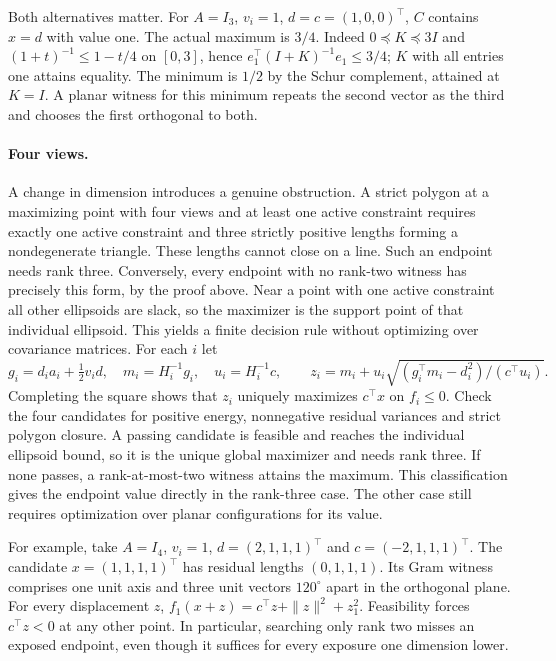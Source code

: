 Both alternatives matter. For $A=I_3$, $v_i=1$, $d=c=(1,0,0)^\top$, $C$ contains $x=d$ with value one. The actual maximum is $3/4$. Indeed $0\preceq K\preceq3I$ and $(1+t)^{-1}\le1-t/4$ on $[0,3]$, hence $e_1^\top(I+K)^{-1}e_1\le3/4$; $K$ with all entries one attains equality. The minimum is $1/2$ by the Schur complement, attained at $K=I$. A planar witness for this minimum repeats the second vector as the third and chooses the first orthogonal to both.

\paragraph{Four views.} A change in dimension introduces a genuine obstruction. A strict polygon at a maximizing point with four views and at least one active constraint requires exactly one active constraint and three strictly positive lengths forming a nondegenerate triangle. These lengths cannot close on a line. Such an endpoint needs rank three. Conversely, every endpoint with no rank-two witness has precisely this form, by the proof above. Near a point with one active constraint all other ellipsoids are slack, so the maximizer is the support point of that individual ellipsoid. This yields a finite decision rule without optimizing over covariance matrices. For each $i$ let
\[
 g_i=d_i a_i+\tfrac12v_id,\quad m_i=H_i^{-1}g_i,\quad u_i=H_i^{-1}c,\qquad
 z_i=m_i+u_i\sqrt{(g_i^\top m_i-d_i^2)/(c^\top u_i)} .
\]
Completing the square shows that $z_i$ uniquely maximizes $c^\top x$ on $f_i\le0$. Check the four candidates for positive energy, nonnegative residual variances and strict polygon closure. A passing candidate is feasible and reaches the individual ellipsoid bound, so it is the unique global maximizer and needs rank three. If none passes, a rank-at-most-two witness attains the maximum. This classification gives the endpoint value directly in the rank-three case. The other case still requires optimization over planar configurations for its value.

For example, take $A=I_4$, $v_i=1$, $d=(2,1,1,1)^\top$ and $c=(-2,1,1,1)^\top$. The candidate $x=(1,1,1,1)^\top$ has residual lengths $(0,1,1,1)$. Its Gram witness comprises one unit axis and three unit vectors $120^\circ$ apart in the orthogonal plane. For every displacement $z$, $f_1(x+z)=c^\top z+\|z\|^2+z_1^2$. Feasibility forces $c^\top z<0$ at any other point. In particular, searching only rank two misses an exposed endpoint, even though it suffices for every exposure one dimension lower.

